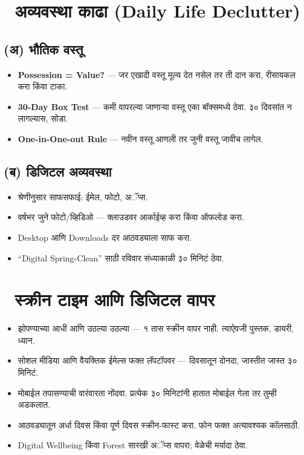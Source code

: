 \section*{🧹 अव्यवस्था काढा (Daily Life Declutter)}

\subsection*{(अ) भौतिक वस्तू}
\begin{itemize}
  \item \textbf{Possession = Value?} — जर एखादी वस्तू मूल्य देत नसेल तर ती दान करा, रीसायकल करा किंवा टाका.  
  \item \textbf{30-Day Box Test} — कमी वापरल्या जाणाऱ्या वस्तू एका बॉक्समध्ये ठेवा. ३० दिवसांत न लागल्यास, सोडा.  
  \item \textbf{One-in-One-out Rule} — नवीन वस्तू आणली तर जुनी वस्तू जावीच लागेल.  
\end{itemize}

\subsection*{(ब) डिजिटल अव्यवस्था}
\begin{itemize}
  \item श्रेणीनुसार साफसफाई: ईमेल, फोटो, अॅप्स.  
  \item वर्षभर जुने फोटो/व्हिडिओ — क्लाउडवर आर्काईव्ह करा किंवा ऑफलोड करा.  
  \item Desktop आणि Downloads दर आठवड्याला साफ करा.  
  \item “Digital Spring-Clean” साठी रविवार संध्याकाळी ३० मिनिटं ठेवा.  
\end{itemize}

\section*{📵 स्क्रीन टाइम आणि डिजिटल वापर}

\begin{itemize}
  \item झोपण्याच्या आधी आणि उठल्या उठल्या — १ तास स्क्रीन वापर नाही. त्याऐवजी पुस्तक, डायरी, ध्यान.  
  \item सोशल मीडिया आणि वैयक्तिक ईमेल्स फक्त लॅपटॉपवर — दिवसातून दोनदा, जास्तीत जास्त ३० मिनिटं.  
  \item मोबाईल तपासण्याची वारंवारता नोंदवा. प्रत्येक ३० मिनिटांनी हातात मोबाईल गेला तर तुम्ही अडकलात.  
  \item आठवड्यातून अर्धा दिवस किंवा पूर्ण दिवस स्क्रीन-फास्ट करा. फोन फक्त अत्यावश्यक कॉलसाठी.  
  \item Digital Wellbeing किंवा Forest सारखी अॅप्स वापरा; वेळेची मर्यादा ठेवा.  
\end{itemize}

